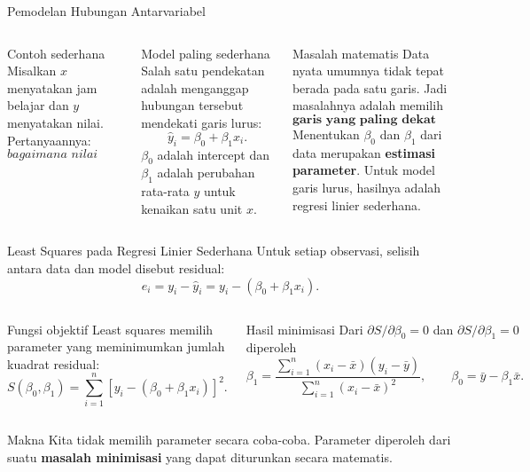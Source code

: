 \documentclass[aspectratio=169,11pt]{beamer}
\begin{document}
\begin{frame}{Pemodelan Hubungan Antarvariabel}
\begin{columns}[T]
\begin{block}{Contoh sederhana}
\footnotesize
Misalkan $x$ menyatakan jam belajar dan $y$ menyatakan nilai. Pertanyaannya:
\[
\textit{bagaimana nilai berubah ketika jam belajar berubah?}
\]
\end{block}
\begin{block}{Model paling sederhana}
\footnotesize
Salah satu pendekatan adalah menganggap hubungan tersebut mendekati garis lurus:
\[
\hat y_i=\beta_0+\beta_1x_i.
\]
$\beta_0$ adalah intercept dan $\beta_1$ adalah perubahan rata-rata $y$ untuk kenaikan satu unit $x$.
\end{block}
\begin{alertblock}{Masalah matematis}
\footnotesize
Data nyata umumnya tidak tepat berada pada satu garis. Jadi masalahnya adalah memilih
\[
\textbf{garis yang paling dekat dengan data.}
\]
Menentukan $\beta_0$ dan $\beta_1$ dari data merupakan \textbf{estimasi parameter}. Untuk model garis lurus, hasilnya adalah regresi linier sederhana.
\end{alertblock}
\end{columns}
\end{frame}

\begin{frame}{Least Squares pada Regresi Linier Sederhana}
\small
Untuk setiap observasi, selisih antara data dan model disebut residual:
\[
e_i=y_i-\hat y_i=y_i-(\beta_0+\beta_1x_i).
\]
\begin{columns}[T]
\begin{block}{Fungsi objektif}
Least squares memilih parameter yang meminimumkan jumlah kuadrat residual:
\[
S(\beta_0,\beta_1)=\sum_{i=1}^{n}
\left[y_i-(\beta_0+\beta_1x_i)\right]^2.
\]
\end{block}
\begin{block}{Hasil minimisasi}
Dari $\partial S/\partial\beta_0=0$ dan $\partial S/\partial\beta_1=0$ diperoleh
\[
\beta_1=\frac{\sum_{i=1}^{n}(x_i-\bar x)(y_i-\bar y)}
{\sum_{i=1}^{n}(x_i-\bar x)^2},
\qquad
\beta_0=\bar y-\beta_1\bar x.
\]
\end{block}
\end{columns}
\begin{alertblock}{Makna}
Kita tidak memilih parameter secara coba-coba. Parameter diperoleh dari suatu \textbf{masalah minimisasi} yang dapat diturunkan secara matematis.
\end{alertblock}
\end{frame}
\end{document}
